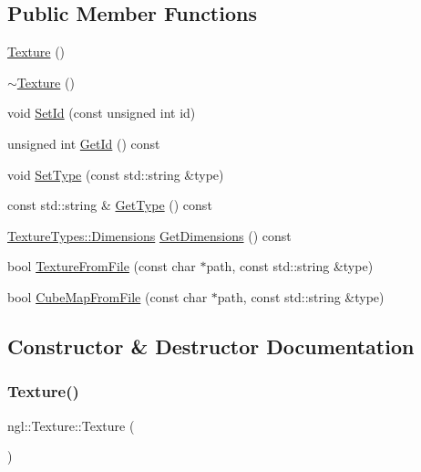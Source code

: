 \subsection*{Public Member Functions}
\begin{DoxyCompactItemize}
\item 
\mbox{\hyperlink{classngl_1_1_texture_a617daea5b5dfd7e0387b78f5a151f95c}{Texture}} ()
\item 
\mbox{\hyperlink{classngl_1_1_texture_a30a5a45fdd980b78fcee13cb05283d2c}{$\sim$\+Texture}} ()
\item 
void \mbox{\hyperlink{classngl_1_1_texture_ada86f445db952a269db8aa4a02226137}{Set\+Id}} (const unsigned int id)
\item 
unsigned int \mbox{\hyperlink{classngl_1_1_texture_ab84f9e0cce00fb6d61fcbe261bba9c43}{Get\+Id}} () const
\item 
void \mbox{\hyperlink{classngl_1_1_texture_a748c9ca0e943af5fd3a3f33270c3a5f1}{Set\+Type}} (const std\+::string \&type)
\item 
const std\+::string \& \mbox{\hyperlink{classngl_1_1_texture_a448ce26648588cd6f5a37593282783c9}{Get\+Type}} () const
\item 
\mbox{\hyperlink{structngl_1_1_texture_types_a83a45c404d98265ef92b45a6a86c479b}{Texture\+Types\+::\+Dimensions}} \mbox{\hyperlink{classngl_1_1_texture_a90fdf8aabbf28403ddcb190bca03e585}{Get\+Dimensions}} () const
\item 
bool \mbox{\hyperlink{classngl_1_1_texture_a5e836876dc5b8ab6dcf7468d492ca05b}{Texture\+From\+File}} (const char $\ast$path, const std\+::string \&type)
\item 
bool \mbox{\hyperlink{classngl_1_1_texture_a47e0be95615fdb9daeddced549ce5a73}{Cube\+Map\+From\+File}} (const char $\ast$path, const std\+::string \&type)
\end{DoxyCompactItemize}


\subsection{Constructor \& Destructor Documentation}
\mbox{\label{classngl_1_1_texture_a617daea5b5dfd7e0387b78f5a151f95c}} 
\subsubsection{\texorpdfstring{Texture()}{Texture()}}
{\footnotesize\ttfamily ngl\+::\+Texture\+::\+Texture (\begin{DoxyParamCaption}{ }\end{DoxyParamCaption})\hspace{0.3cm}{\ttfamily [explicit]}}

